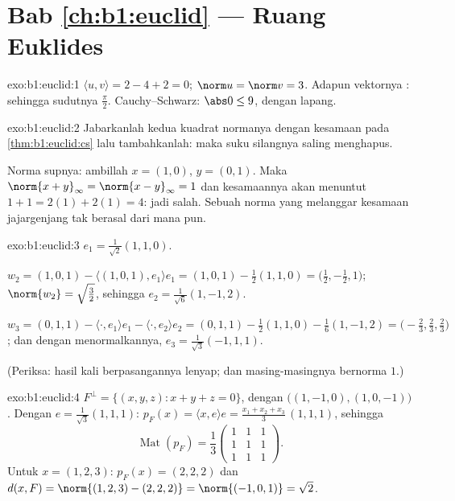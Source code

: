 \section*{Bab \ref{ch:b1:euclid} --- Ruang Euklides}

\begin{solution}{exo:b1:euclid:1}
$\langle u, v\rangle = 2 - 4 + 2 = 0$; $\norm u = \norm v = 3$. Adapun
vektornya : sehingga sudutnya $\frac\pi2$. Cauchy--Schwarz:
$\abs 0 \leq 9$, dengan lapang.
\end{solution}

\begin{solution}{exo:b1:euclid:2}
Jabarkanlah kedua kuadrat normanya dengan kesamaan pada
\cref{thm:b1:euclid:cs} lalu tambahkanlah: maka suku silangnya saling menghapus.

Norma supnya: ambillah $x = (1, 0)$, $y = (0, 1)$. Maka $\norm{x + y}_\infty
= \norm{x - y}_\infty = 1$ dan kesamaannya akan menuntut $1 + 1 =
2(1) + 2(1) = 4$: jadi salah. Sebuah norma yang melanggar kesamaan
jajargenjang tak berasal dari  mana pun.
\end{solution}

\begin{solution}{exo:b1:euclid:3}
$e_1 = \frac{1}{\sqrt 2}(1,1,0)$.

$w_2 = (1,0,1) - \langle (1,0,1), e_1\rangle e_1 = (1,0,1) -
\frac{1}{2}(1,1,0) = \bigl(\tfrac12, -\tfrac12, 1\bigr)$;
$\norm{w_2} = \sqrt{\tfrac32}$, sehingga $e_2 =
\frac{1}{\sqrt 6}(1, -1, 2)$.

$w_3 = (0,1,1) - \langle\cdot, e_1\rangle e_1 - \langle\cdot,
e_2\rangle e_2 = (0,1,1) - \frac12 (1,1,0) - \frac16(1,-1,2) =
\bigl(-\tfrac23, \tfrac23, \tfrac23\bigr)$; dan dengan menormalkannya, $e_3 =
\frac{1}{\sqrt 3}(-1, 1, 1)$.

(Periksa: hasil kali berpasangannya lenyap; dan masing-masingnya bernorma $1$.)
\end{solution}

\begin{solution}{exo:b1:euclid:4}
$F^\perp = \{(x,y,z) : x + y + z = 0\}$, dengan  $\bigl((1,-1,0),
(1,0,-1)\bigr)$. Dengan $e = \frac{1}{\sqrt3}(1,1,1)$: $p_F(x) =
\langle x, e\rangle e = \frac{x_1 + x_2 + x_3}{3}\,(1,1,1)$, sehingga
\[
\operatorname{Mat}(p_F) = \frac13
\begin{pmatrix} 1&1&1\\ 1&1&1\\ 1&1&1\end{pmatrix}.
\]
Untuk $x = (1,2,3)$: $p_F(x) = (2,2,2)$ dan $d(x, F) = \norm{(1,2,3)
- (2,2,2)} = \norm{(-1,0,1)} = \sqrt 2$.
\end{solution}

